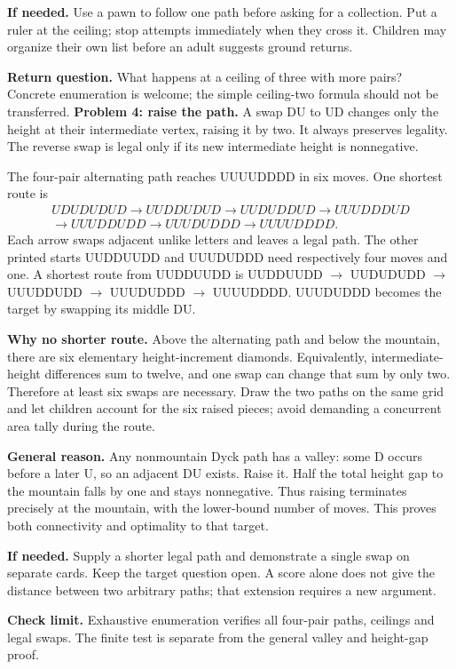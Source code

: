 \documentclass[11pt]{article}
\begin{document}
\textbf{If needed.} Use a pawn to follow one path before asking for a collection. Put a ruler at the ceiling; stop attempts immediately when they cross it. Children may organize their own list before an adult suggests ground returns.

\textbf{Return question.} What happens at a ceiling of three with more pairs? Concrete enumeration is welcome; the simple ceiling-two formula should not be transferred.
\newpage
\textbf{Problem 4: raise the path.} A swap DU to UD changes only the height at their intermediate vertex, raising it by two. It always preserves legality. The reverse swap is legal only if its new intermediate height is nonnegative.

The four-pair alternating path reaches UUUUDDDD in six moves. One shortest route is
\[
\begin{array}{l}
UDUDUDUD\to UUDDUDUD\to UUDUDDUD\to UUUDDDUD\\
\to UUUDDUDD\to UUUDUDDD\to UUUUDDDD.
\end{array}
\]
Each arrow swaps adjacent unlike letters and leaves a legal path. The other printed starts UUDDUUDD and UUUDUDDD need respectively four moves and one. A shortest route from UUDDUUDD is UUDDUUDD $\to$ UUDUDUDD $\to$ UUUDDUDD $\to$ UUUDUDDD $\to$ UUUUDDDD. UUUDUDDD becomes the target by swapping its middle DU.

\textbf{Why no shorter route.} Above the alternating path and below the mountain, there are six elementary height-increment diamonds. Equivalently, intermediate-height differences sum to twelve, and one swap can change that sum by only two. Therefore at least six swaps are necessary. Draw the two paths on the same grid and let children account for the six raised pieces; avoid demanding a concurrent area tally during the route.

\textbf{General reason.} Any nonmountain Dyck path has a valley: some D occurs before a later U, so an adjacent DU exists. Raise it. Half the total height gap to the mountain falls by one and stays nonnegative. Thus raising terminates precisely at the mountain, with the lower-bound number of moves. This proves both connectivity and optimality to that target.

\textbf{If needed.} Supply a shorter legal path and demonstrate a single swap on separate cards. Keep the target question open. A score alone does not give the distance between two arbitrary paths; that extension requires a new argument.

\textbf{Check limit.} Exhaustive enumeration verifies all four-pair paths, ceilings and legal swaps. The finite test is separate from the general valley and height-gap proof.
\end{document}
